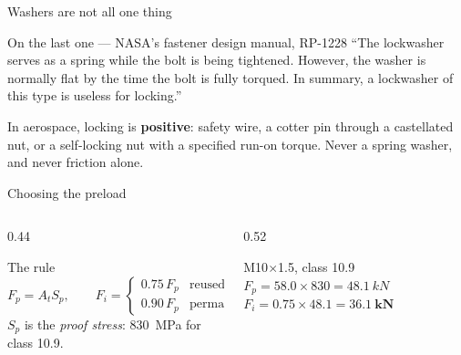 \documentclass[aspectratio=169,10pt]{beamer}
\begin{document}
\begin{frame}{Washers are not all one thing}
\centering
\resizebox{0.99\textwidth}{!}{}
\vfill
\raggedright
\begin{alertblock}{On the last one --- NASA's fastener design manual, RP-1228}
``The lockwasher serves as a spring while the bolt is being tightened. However, the washer is normally
flat by the time the bolt is fully torqued. \alert{In summary, a lockwasher of this type is useless
for locking.}''
\end{alertblock}
\vfill
{\small In aerospace, locking is \textbf{positive}: safety wire, a cotter pin through a castellated
nut, or a self-locking nut with a specified run-on torque. Never a spring washer, and never friction
alone.}
\end{frame}

\begin{frame}{Choosing the preload}
\centering
\resizebox{!}{3.3cm}{}
\vfill
\raggedright
\begin{columns}[T]
\begin{column}{0.44\textwidth}
\begin{block}{The rule}
\small
\[ F_p = A_t S_p, \qquad
   F_i = \begin{cases} 0.75\,F_p & \text{reused} \\ 0.90\,F_p & \text{permanent}\end{cases} \]
\vspace{-6pt}
{\footnotesize $S_p$ is the \emph{proof stress}: \SI{830}{MPa} for class 10.9.}
\end{block}
\end{column}
\begin{column}{0.52\textwidth}
\begin{block}{M10$\times$1.5, class 10.9}
\small
$F_p = 58.0\times830 = \SI{48.1}{kN}$\\[3pt]
$F_i = 0.75\times48.1 = \mathbf{\SI{36.1}{kN}}$
\end{block}
\end{column}
\end{columns}
\end{frame}
\end{document}
